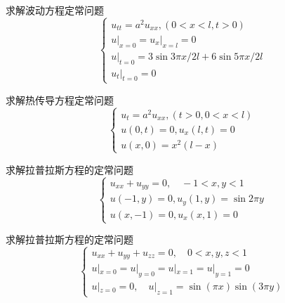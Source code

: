 \begin{Exercises}
$$$$
\item 求解波动方程定常问题
$$
\left\{\begin{array}{l}
u_{t t}=a^2 u_{x x},(0<x<l, t>0) \\
\left.u\right|_{x=0}=\left.u_x\right|_{x=l}=0 \\
\left.u\right|_{t=0}=3 \sin 3 \pi x / 2 l+6 \sin 5 \pi x / 2 l \\
\left.u_t\right|_{t=0}=0
\end{array}\right.
$$
\item 求解热传导方程定常问题
$$
\left\{\begin{array}{l}
u_t=a^2 u_{x x},(t>0,0<x<l) \\
u(0, t)=0, u_x(l, t)=0 \\
u(x, 0)=x^2(l-x)
\end{array}\right.
$$
\item 求解拉普拉斯方程的定常问题
$$
\left\{\begin{array}{l}
u_{x x}+u_{y y}=0, \quad -1<x, y<1 \\
u(-1, y)=0, u_y(1, y)=\sin 2 \pi y \\
u(x, -1)=0, u_x(x, 1)=0
\end{array}\right.
$$
\item 求解拉普拉斯方程的定常问题
$$
\left\{\begin{array}{l}
u_{x x}+u_{y y} +u_{z z}=0, \quad 0<x, y, z<1 \\
u|_{x=0}=u|_{y=0}=u|_{x=1}=u|_{y=1} =0\\
u|_{z=0}=0, \quad u|_{z=1}=\sin(\pi x)\sin(3\pi y)
\end{array}\right.
$$
\end{Exercises}
 

 

	

 